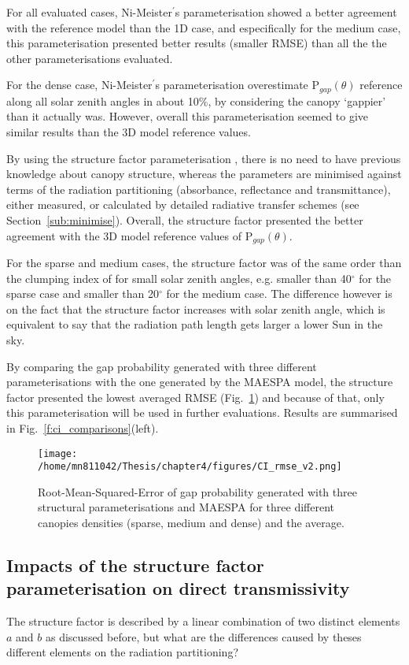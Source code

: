 \documentclass[a4paper,11pt]{report}
\begin{document}
For all evaluated cases, Ni-Meister$^{\prime}$s parameterisation showed a better agreement with the reference model than the 1D case, and especifically for the medium case, this parameterisation presented better results (smaller RMSE) than all the the other parameterisations evaluated.  

For the dense case, Ni-Meister$^{\prime}$s parameterisation overestimate P$_{gap}(\theta)$ reference along all solar zenith angles in about 10\%, by considering the canopy `gappier' than it actually was. However, overall this parameterisation seemed to give similar results than the 3D model reference values. 

By using the structure factor parameterisation \citep{pinty2006}, there is no need to have previous knowledge about canopy structure, whereas the parameters are minimised against terms of the radiation partitioning (absorbance, reflectance and transmittance), either measured, or calculated by detailed radiative transfer schemes (see Section~\ref{sub:minimise}). Overall, the structure factor presented the better agreement with the 3D model reference values of P$_{gap}(\theta)$.

For the sparse and medium cases, the structure factor was of the same order than the clumping index of \citet{Ni-Meister2010} for small solar zenith angles, e.g. smaller than 40$^{\circ}$ for the sparse case and smaller than 20$^{\circ}$ for the medium case. The difference however is on the fact that the structure factor increases with solar zenith angle, which is equivalent to say that the radiation path length gets larger a lower Sun in the sky. 

By comparing the gap probability generated with three different parameterisations with the one generated by the MAESPA model, the structure factor presented the lowest averaged RMSE (Fig.~\ref{fig:ci_rmse}) and because of that, only this parameterisation will be used in further evaluations. Results are summarised in Fig.~\ref{f:ci_comparisons}(left).

\begin{figure}
\centering
\texttt{[image: /home/mn811042/Thesis/chapter4/figures/CI\_rmse\_v2.png]}
\caption{Root-Mean-Squared-Error of gap probability generated with three structural parameterisations and MAESPA for three different canopies densities (sparse, medium and dense) and the average.} 
\label{fig:ci_rmse}
\end{figure}

\subsection{Impacts of the structure factor parameterisation on direct transmissivity}
The structure factor is described by a linear combination of two distinct elements $a$ and $b$ as discussed before, but what are the differences caused by theses different elements on the radiation partitioning?
\end{document}
